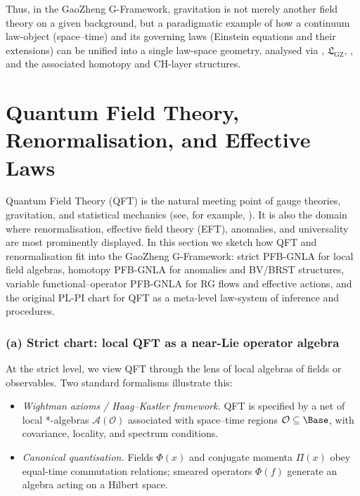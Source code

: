 \documentclass[11pt]{book}
\theoremstyle{plain}
\theoremstyle{definition}
\newcommand{\GZLS}{\ensuremath{\mathfrak{L}_{\mathrm{GZ}}}}       \newcommand{\GZLT}{\ensuremath{M_{!w}}}                           \newcommand{\GZLOC}{\ensuremath{A_M}}                             \newcommand{\GZLCurv}{\ensuremath{\mathcal{F}_{\mathrm{law}}}}
\begin{document}
Thus, in the GaoZheng G-Framework, gravitation is not merely another
field theory on a given background, but a paradigmatic example of how a
continuum law-object (space--time) and its governing laws (Einstein
equations and their extensions) can be unified into a single law-space
geometry, analysed via \GAlgebra, \GZLS, \GZTLC, and the associated
homotopy and CH-layer structures.



\section{Quantum Field Theory, Renormalisation, and Effective Laws}


Quantum Field Theory (QFT) is the natural meeting point of gauge
theories, gravitation, and statistical mechanics (see, for example, \cite{Weinberg1995,Haag1996}). It is also the domain
where renormalisation, effective field theory (EFT), anomalies, and
universality are most prominently displayed. In this section we sketch
how QFT and renormalisation fit into the GaoZheng G-Framework: strict
PFB-GNLA for local field algebras, homotopy PFB-GNLA for anomalies and
BV/BRST structures, variable functional--operator PFB-GNLA for RG flows
and effective actions, and the original PL-PI chart for QFT as a
meta-level law-system of inference and procedures.



\subsubsection*{(a) Strict chart: local QFT as a near-Lie operator algebra}

At the strict level, we view QFT through the lens of local algebras of
fields or observables. Two standard formalisms illustrate this:

\begin{itemize}
  \item \emph{Wightman axioms / Haag--Kastler framework.}
        QFT is specified by a net of local *-algebras
        $\mathcal{A}(\mathcal{O})$ associated with space--time regions
        $\mathcal{O}\subseteq\Base$, with covariance, locality, and
        spectrum conditions.
  \item \emph{Canonical quantisation.}
        Fields $\Phi(x)$ and conjugate momenta $\Pi(x)$ obey equal-time
        commutation relations; smeared operators $\Phi(f)$ generate an
        algebra acting on a Hilbert space.
\end{itemize}
\end{document}
